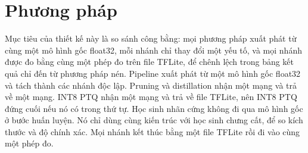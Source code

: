 \documentclass[13pt,a4paper]{article}
\begin{document}
\section{Phương pháp}
Mục tiêu của thiết kế này là so sánh công bằng: mọi phương pháp xuất phát từ cùng một mô hình gốc float32, mỗi nhánh chỉ thay đổi một yếu tố, và mọi nhánh được đo bằng cùng một phép đo trên file TFLite, để chênh lệch trong bảng kết quả chỉ đến từ phương pháp nén.
Pipeline xuất phát từ một mô hình gốc float32 và tách thành các nhánh độc lập.
Pruning và distillation nhận một mạng và trả về một mạng.
INT8 PTQ nhận một mạng và trả về file TFLite, nên INT8 PTQ đứng cuối nếu nó có trong thứ tự.
Học sinh nhãn cứng không đi qua mô hình gốc ở bước huấn luyện.
Nó chỉ dùng cùng kiến trúc với học sinh chưng cất, để so kích thước và độ chính xác.
Mọi nhánh kết thúc bằng một file TFLite rồi đi vào cùng một phép đo.
\end{document}
